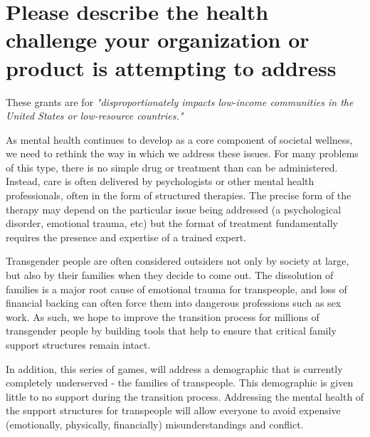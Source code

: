 \section{Please describe the health challenge your organization or product is attempting to address}

These grants are for \textit{"disproportionately impacts low-income communities in the United States or low-resource countries."}


As mental health continues to develop as a core component of societal wellness, we need to rethink the way in which we address these issues. For many problems of this type, there is no simple drug or treatment than can be administered. Instead, care is often delivered by psychologists or other mental health professionals, often in the form of structured therapies. The precise form of the therapy may depend on the particular issue being addressed (a psychological disorder, emotional trauma, etc) but the format of treatment fundamentally requires the presence and expertise of a trained expert.


Transgender people are often considered outsiders not only by society at large, but also by their families when they decide to come out. The dissolution of families is a major root cause of emotional trauma for transpeople\cite{simons2013parental}, and loss of financial backing can often force them into dangerous professions such as sex work. As such, we hope to improve the transition process for millions of transgender people by building tools that help to ensure that critical family support structures remain intact.


In addition, this series of games, will address a demographic that is currently completely underserved - the families of transpeople. This demographic is given little to no support during the transition process. Addressing the mental health of the support structures for transpeople will allow everyone to avoid expensive (emotionally, physically, financially) misunderstandings and conflict.





